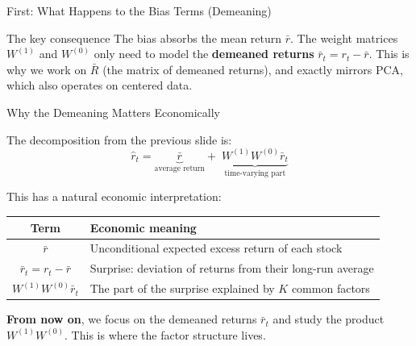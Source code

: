 \documentclass[aspectratio=169]{beamer}
\begin{document}
%
%
\begin{frame}{First: What Happens to the Bias Terms (Demeaning)}

\begin{block}{The key consequence}
The bias absorbs the mean return $\bar{r}$. The weight matrices $W^{(1)}$ and $W^{(0)}$ only need to model the \textbf{demeaned returns} $\bar{r}_t = r_t - \bar{r}$. This is why we work on $\bar{R}$ (the matrix of demeaned returns), and exactly mirrors PCA, which also operates on centered data.
\end{block}

\end{frame}
%
%
\begin{frame}{Why the Demeaning Matters Economically}

The decomposition from the previous slide is:
\[
\hat{r}_t = \underbrace{\bar{r}}_{\text{average return}} + \;\underbrace{W^{(1)}W^{(0)}\bar{r}_t}_{\text{time-varying part}}
\]

\vspace{0.3em}

This has a natural economic interpretation:

\vspace{0.3em}

\begin{center}
\renewcommand{\arraystretch}{1.5}
\begin{tabular}{c l}
\hline
\textbf{Term} & \textbf{Economic meaning} \\
\hline
$\bar{r}$ & Unconditional expected excess return of each stock \\
$\bar{r}_t = r_t - \bar{r}$ & Surprise: deviation of returns from their long-run average \\
$W^{(1)}W^{(0)}\bar{r}_t$ & The part of the surprise explained by $K$ common factors \\
\hline
\end{tabular}
\end{center}

\vspace{0.5em}

\textbf{From now on}, we focus on the demeaned returns $\bar{r}_t$ and study the product $W^{(1)}W^{(0)}$. This is where the factor structure lives.



\end{frame}
\end{document}
